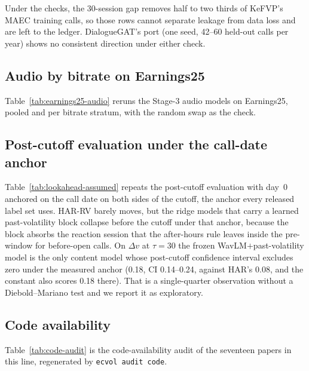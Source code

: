 Under the checks, the 30-session gap removes half to two thirds of KeFVP's MAEC
training calls, so those rows cannot separate leakage from data loss and are left
to the ledger. DialogueGAT's port (one seed, 42--60 held-out calls per year) shows
no consistent direction under either check.





\subsection{Audio by bitrate on Earnings25}
Table~\ref{tab:earnings25-audio} reruns the Stage-3 audio models on Earnings25,
pooled and per bitrate stratum, with the random swap as the check.


\subsection{Post-cutoff evaluation under the call-date anchor}
Table~\ref{tab:lookahead-assumed} repeats the post-cutoff evaluation with day~0
anchored on the call date on both sides of the cutoff, the anchor every released
label set uses. HAR-RV barely moves, but the ridge models that carry a learned
past-volatility block collapse before the cutoff under that anchor, because the
block absorbs the reaction session that the after-hours rule leaves inside the
pre-window for before-open calls. On $\Delta v$ at $\tau{=}30$ the frozen
WavLM$+$past-volatility model is the only content model whose post-cutoff
confidence interval excludes zero under the measured anchor (0.18, CI 0.14--0.24,
against HAR's 0.08, and the constant also scores 0.18 there).
That is a single-quarter observation without a Diebold--Mariano test and we report
it as exploratory.


\subsection{Code availability}
Table~\ref{tab:code-audit} is the code-availability audit of the seventeen papers
in this line, regenerated by \texttt{ecvol audit code}.


